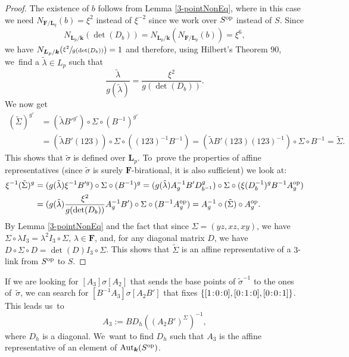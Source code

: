 \documentclass[JEP,XML,SOM,Unicode,NoFloatCountersInSection, NoEqCountersInSection,published]{cedram}
\newcommand{\op}{\textup{op}}
\newcommand{\sep}{\mkern2mu{:}\mkern2mu}
\theoremstyle{definition}
\newcommand{\kk}{{\boldsymbol{k}}}
\newcommand{\FF}{{\boldsymbol{F}}}
\newcommand{\LL}{{\boldsymbol{L}}}
\DeclareMathOperator{\Aut}{Aut}
\begin{document}
\begin{proof}
The existence of $b$ follows from Lemma \ref{3-pointNonEq}, where in this case we need $N_{\FF/\LL_q}(b) = \xi^2$ instead of $\xi^{-2}$ since we work over $S^{\op}$ instead of $S$. Since
\[
N_{\LL_p / \kk}(\det(D_b)) = N_{\LL_p / \kk}(N_{\FF/\LL_p}(b)) = \xi^6,
\]
we have $N_{\LL_p / \kk}(\sfrac{\xi^2}{g(\det(D_b))}) = 1$ and therefore, using Hilbert's Theorem 90, we~find a $\tilde \lambda \in L_p$ such that
\[
\frac{\tilde \lambda}{g(\tilde \lambda)} = \frac{\xi^2}{g(\det(D_b))}.
\]
We now get\vspace*{-3pt}
\begin{align*}
(\tilde \Sigma)^{g'} &= (\tilde \lambda B'^{g'}) \circ \Sigma \circ (B^{-1})^{g'}
\\
&= (\tilde \lambda B' (123)) \circ \Sigma \circ ((123)^{-1} B^{-1}) = (\tilde \lambda B' (123) (123)^{-1}) \circ \Sigma \circ B^{-1} = \tilde \Sigma.
\end{align*}
This shows that $\tilde \sigma$ is defined over $\LL_p$. To~prove the properties of affine representatives (since $\tilde \sigma$ is surely $\FF$-birational, it is also sufficient) we look at:\vspace*{-3pt}
\begin{align*}
\xi^{-1}(\tilde \Sigma)^g &= (g(\tilde \lambda)\xi^{-1} B'^g) \circ \Sigma \circ (B^{-1})^g = (g(\tilde \lambda) A_g^{-1} B' D_{b^{-1}}^g) \circ \Sigma \circ (\xi (D_{b}^{-1})^g B^{-1} A_g^{\op})
\\
&= (g(\tilde \lambda) \frac{\xi^2}{g(\det(D_b))} A_g^{-1} B') \circ \Sigma \circ (B^{-1}A_g^{\op}) = A_g^{-1} \circ (\tilde \Sigma) \circ A_g^{\op}.
\end{align*}
By Lemma \ref{3-pointNonEq} and the fact that since $\Sigma = (yz,xz, xy)$, we have $\Sigma \circ \lambda I_3 = \lambda^2I_3 \circ \Sigma$, $\lambda \in \FF$, and, for any diagonal matrix $D$, we have $D \circ \Sigma \circ D = \det(D) I_3 \circ \Sigma$. This shows that $\tilde \Sigma$ is an affine representative of a $3$\nobreakdash-link from $S^{\op}$ to $S$.
\end{proof}

If we are looking for $[A_3] \sigma [A_2]$ that sends the base points of $\tilde \sigma^{-1}$ to the ones of~$\tilde \sigma$, we can search for $[B^{-1} A_3] \sigma [A_2 B']$ that fixes $\{ [1\sep 0\sep 0], [0\sep 1\sep 0], [0\sep 0\sep 1]\}$. This leads us~to\vspace*{-3pt}
\[
A_3 := B D_h ((A_2B')^{\Sigma})^{-1},
\]
where $D_h$ is a diagonal. We~want to find $D_h$ such that $A_3$ is the affine representative of an element of $\Aut_{\kk}(S^{\op})$.
\end{document}
